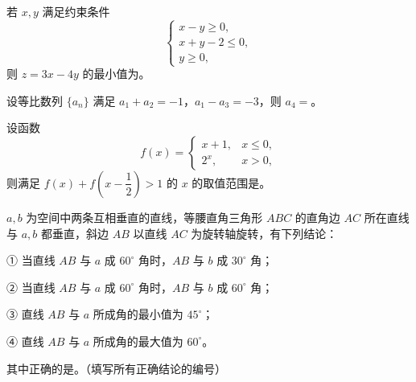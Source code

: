 \begin{question}
若 \(x,y\) 满足约束条件
\nopagebreak[4]
\[
\begin{cases}
x-y\ge 0,\\
x+y-2\le 0,\\
y\ge 0,
\end{cases}
\]
则 \(z=3x-4y\) 的最小值为\gkblank{}。

\end{question}
\begin{question}
设等比数列 \(\{a_n\}\) 满足 \(a_1+a_2=-1\)，\(a_1-a_3=-3\)，则 \(a_4=\)\gkblank{}。

\end{question}
\begin{question}
设函数
\nopagebreak[4]
\[
f(x)=\begin{cases}
x+1,&x\le 0,\\
2^x,&x>0,
\end{cases}
\]
则满足 \(f(x)+f\left(x-\dfrac12\right)>1\) 的 \(x\) 的取值范围是\gkblank{}。

\end{question}
\begin{question}
\(a,b\) 为空间中两条互相垂直的直线，等腰直角三角形 \(ABC\) 的直角边 \(AC\) 所在直线与 \(a,b\) 都垂直，斜边 \(AB\) 以直线 \(AC\) 为旋转轴旋转，有下列结论：

   ① 当直线 \(AB\) 与 \(a\) 成 \(60^\circ\) 角时，\(AB\) 与 \(b\) 成 \(30^\circ\) 角；

   ② 当直线 \(AB\) 与 \(a\) 成 \(60^\circ\) 角时，\(AB\) 与 \(b\) 成 \(60^\circ\) 角；

   ③ 直线 \(AB\) 与 \(a\) 所成角的最小值为 \(45^\circ\)；

   ④ 直线 \(AB\) 与 \(a\) 所成角的最大值为 \(60^\circ\)。

   其中正确的是\gkblank{}。（填写所有正确结论的编号）

\end{question}

